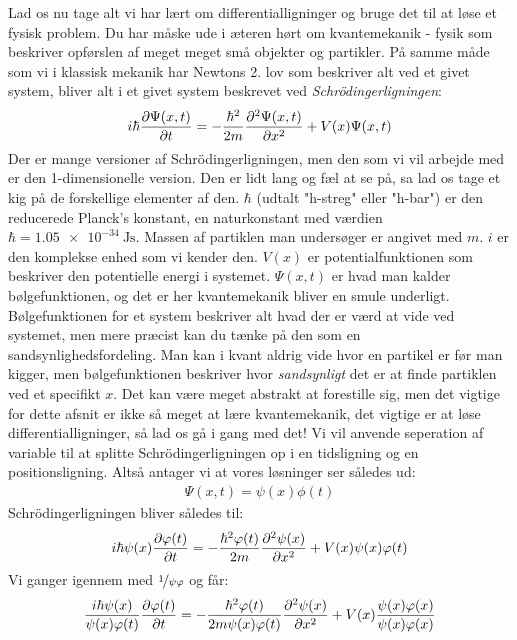 \documentclass[crop=false, class=memoir]{standalone}
\begin{document}
Lad os nu tage alt vi har lært om differentialligninger og bruge det til at løse et fysisk problem. Du har måske ude i æteren hørt om kvantemekanik - fysik som beskriver opførslen af meget meget små objekter og partikler. På samme måde som vi i klassisk mekanik har Newtons 2. lov som beskriver alt ved et givet system, bliver alt i et givet system beskrevet ved \emph{Schrödingerligningen}:
\begin{align}
    i\hbar \pdv{\Psi(x,t)}{t} = -\frac{\hbar^2}{2 m}\pdv[2]{\Psi(x,t)}{x} + V(x)\Psi(x,t)
\end{align}
Der er mange versioner af Schrödingerligningen, men den som vi vil arbejde med er den 1-dimensionelle version. Den er lidt lang og fæl at se på, sa lad os tage et kig på de forskellige elementer af den. $\hbar$ (udtalt "h-streg" eller "h-bar") er den reducerede Planck's konstant, en naturkonstant med værdien $\hbar = \SI{1.05e-34}{\joule \second}$. Massen af partiklen man undersøger er angivet med $m$. $i$ er den komplekse enhed som vi kender den. $V(x)$ er potentialfunktionen som beskriver den potentielle energi i systemet. $\Psi(x,t)$ er hvad man kalder bølgefunktionen, og det er her kvantemekanik bliver en smule underligt. Bølgefunktionen for et system beskriver alt hvad der er værd at vide ved systemet, men mere præcist kan du tænke på den som en sandsynlighedsfordeling. Man kan i kvant aldrig vide hvor en partikel er før man kigger, men bølgefunktionen beskriver hvor \emph{sandsynligt} det er at finde partiklen ved et specifikt $x$. Det kan være meget abstrakt at forestille sig, men det vigtige for dette afsnit er ikke så meget at lære kvantemekanik, det vigtige er at løse differentialligninger, så lad os gå i gang med det! Vi vil anvende seperation af variable til at splitte Schrödingerligningen op i en tidsligning og en positionsligning. Altså antager vi at vores løsninger ser således ud:
\begin{align}
    \Psi(x,t) = \psi(x)\phi(t)
\end{align}
Schrödingerligningen bliver således til:
\begin{align}
    i\hbar \psi(x) \pdv{\phi(t)}{t} = -\frac{\hbar^2 \phi(t)}{2m}\pdv[2]{\psi(x)}{x} + V(x)\psi(x)\phi(t)
\end{align}
Vi ganger igennem med $\nicefrac{1}{\psi\phi}$ og får:
\begin{align}
    \frac{i\hbar \psi(x)}{\psi(x) \phi(t)}\pdv{\phi(t)}{t} = - \frac{\hbar^2\phi(t)}{2m \psi(x)\phi(t)}\pdv[2]{\psi(x)}{x} + V(x)\frac{\psi(x)\phi(x)}{\psi(x)\phi(x)}
\end{align}
\end{document}
